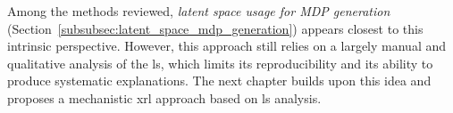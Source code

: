 Among the methods reviewed, \textit{latent space usage for MDP generation} (Section~\ref{subsubsec:latent_space_mdp_generation}) appears closest to this intrinsic perspective.
However, this approach still relies on a largely manual and qualitative analysis of the \gls{ls}, which limits its reproducibility and its ability to produce systematic explanations.
The next chapter builds upon this idea and proposes a mechanistic \gls{xrl} approach based on \gls{ls} analysis.

